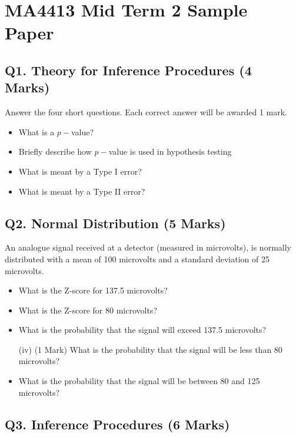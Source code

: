 \documentclass[]{article}
\title{}
\author{}
\begin{document}
\section*{MA4413 Mid Term 2 Sample Paper}

\subsection*{Q1. Theory for Inference Procedures (4 Marks)}
Answer the four short questions. Each correct answer will be awarded 1 mark.
\begin{itemize}
\item  What is a $p-$value?
\item  Briefly describe how $p-$value is used in hypothesis testing
\item  What is meant by a Type I error?
\item   What is meant by a Type II error?
\end{itemize}

\subsection*{Q2. Normal Distribution (5 Marks)}
An analogue signal received at a detector (measured in microvolts), is normally distributed with a mean of 100 microvolts 
and a standard deviation of 25 microvolts.

\begin{itemize}
\item  What is the Z-score for 137.5 microvolts? 
\item  What is the Z-score for 80 microvolts?
\item  What is the probability that the signal will exceed 137.5 microvolts? 
\item[(iv)](1 Mark) What is the probability that the signal will be less than 80 microvolts?
\item   What is the probability that the signal will be between 80 and 125 microvolts?
\end{itemize}


\newpage
\subsection*{Q3. Inference Procedures (6 Marks)}
\end{document}
